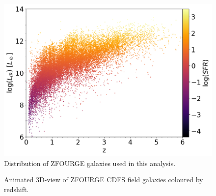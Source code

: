 \begin{figure}
    \centering
    \includegraphics[width=\textwidth]{Figures/ZFOURGE Initial Distribution.png}
    \caption{Distribution of ZFOURGE galaxies used in this analysis.}
    \label{Fig: ZFOURGE Distribution}
\end{figure}

\begin{figure}[t!]
    \setlength{\abovecaptionskip}{60pt} %
    \caption{Animated 3D-view of ZFOURGE CDFS field galaxies coloured by redshift.}
    \setlength{\abovecaptionskip}{10pt} %
\end{figure}